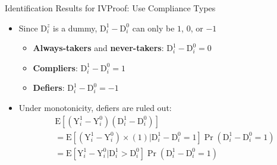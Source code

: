 \documentclass[dvipsnames,hyperref={pdfpagelabels=false}]{beamer}
\begin{document}
\begin{frame}{Identification Results for IV}{Proof: Use Compliance Types}
	\begin{itemize}
		
		\item Since $\mathrm{D}^{z}_{i}$ is a dummy, $\mathrm{D}^{1}_{i}-\mathrm{D}^{0}_{i}$ can only be $1$, $0$, or $-1$
		\vspace{0.2cm}
		\begin{itemize}
			\item \textbf{Always-takers} and \textbf{never-takers}: $\mathrm{D}^{1}_{i}-\mathrm{D}^{0}_{i}=0$
			\vspace{0.2cm}
			\item \textbf{Compliers}: $\mathrm{D}^{1}_{i}-\mathrm{D}^{0}_{i}=1$
			\vspace{0.2cm}
			\item \textbf{Defiers}: $\mathrm{D}^{1}_{i}-\mathrm{D}^{0}_{i}=-1$	
			\vspace{0.2cm}	
		\end{itemize}	
		\item Under monotonicity, defiers are ruled out:
		\begin{equation*}
			\begin{aligned}
				& \mathrm{E}[(\mathrm{Y}^{1}_{i}-\mathrm{Y}^{0}_{i})(\mathrm{D}^{1}_{i}-\mathrm{D}^{0}_{i})]  \\
				& = \mathrm{E}[(\mathrm{Y}^{1}_{i}-\mathrm{Y}^{0}_{i}) \times (1)|\mathrm{D}^{1}_{i}-\mathrm{D}^{0}_{i}=1] \Pr(\mathrm{D}^{1}_{i}-\mathrm{D}^{0}_{i}=1) \\
				& = \mathrm{E}[\mathrm{Y}^{1}_{i}-\mathrm{Y}^{0}_{i}|\mathrm{D}^{1}_{i}>\mathrm{D}^{0}_{i}] \Pr(\mathrm{D}^{1}_{i}-\mathrm{D}^{0}_{i}=1)
			\end{aligned}
		\end{equation*}
		
		
	\end{itemize}	
\end{frame}
\end{document}
